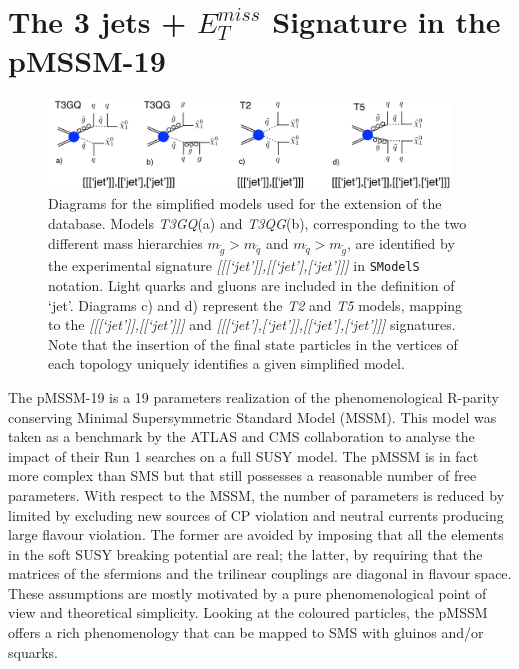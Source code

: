 \documentclass[a4paper,11pt]{article}
\newcommand{\SMO}{\texttt{SModelS\xspace}}
\begin{document}
\section{The 3 jets + $E_T ^{miss}$ Signature in the pMSSM-19 }\label{sec::T3GQ}
\begin{figure}[!ht]
	\begin{center}
		\includegraphics[width=0.95\textwidth]{PLOTS/diagrams.png}
	\end{center}
	\caption{Diagrams for the simplified models used for the extension of the database. Models \textit{T3GQ}(a) and \textit{T3QG}(b), corresponding to the two different mass hierarchies $m_{\tilde g} > m_{\tilde q}$ and $m_{\tilde q} > m_{\tilde g}$, are identified by the experimental signature \textit{[[[`jet']],[[`jet'],[`jet']]]} in \SMO~ notation. Light quarks and gluons are included in the definition of `jet'. Diagrams c) and d) represent the \textit{T2} and \textit{T5} models, mapping to the \textit{[[[`jet']],[[`jet']]]} and \textit{[[[`jet'],[`jet']],[[`jet'],[`jet']]]} signatures. Note that the insertion of the final state particles in the vertices of each topology uniquely identifies a given simplified model.}
	\label{Diagrams}
\end{figure}

The pMSSM-19 is a 19 parameters realization of the phenomenological R-parity conserving Minimal Supersymmetric Standard Model (MSSM). This model was taken as a benchmark by the ATLAS and CMS collaboration to analyse the impact of their Run 1 searches on a full SUSY model. The pMSSM is in fact more complex than SMS but that still possesses a reasonable number of free parameters. With respect to the MSSM, the number of parameters is reduced by limited by excluding new sources of CP violation and neutral currents producing large flavour violation. The former are avoided by imposing that all the elements in the soft SUSY breaking potential are real; the latter, by requiring that the matrices of the sfermions and the trilinear couplings are diagonal in flavour space. These assumptions are mostly motivated by a pure phenomenological point of view and theoretical simplicity. Looking at the coloured particles, the pMSSM offers a rich phenomenology that can be mapped to SMS with gluinos and/or squarks.
\end{document}

